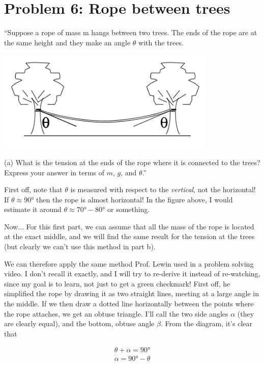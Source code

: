 \documentclass[12pt,a4paper]{report}
\begin{document}
\section{Problem 6: Rope between trees}

``Suppose a rope of mass m hangs between two trees. The ends of the rope are at the same height and they make an angle $\theta$ with the trees.

\begin{center}
\includegraphics[scale=0.5]{Graphics/h3p6}
\end{center}

(a) What is the tension at the ends of the rope where it is connected to the trees? Express your answer in terms of $m$, $g$, and $\theta$.''

First off, note that $\theta$ is measured with respect to the \emph{vertical}, not the horizontal! If $\theta \approx \ang{90}$ then the rope is almost horizontal! In the figure above, I would estimate it around $\theta \approx \ang{70}-\ang{80}$ or something.

Now... For this first part, we can assume that all the mass of the rope is located at the exact middle, and we will find the same result for the tension at the trees (but clearly we can't use this method in part b).

We can therefore apply the same method Prof. Lewin used in a problem solving video. I don't recall it exactly, and I will try to re-derive it instead of re-watching, since my goal is to learn, not just to get a green checkmark! First off, he simplified the rope by drawing it as two straight lines, meeting at a large angle in the middle. If we then draw a dotted line horizontally between the points where the rope attaches, we get an obtuse triangle. I'll call the two side angles $\alpha$ (they are clearly equal), and the bottom, obtuse angle $\beta$. From the diagram, it's clear that

\begin{align}
\theta + \alpha = \ang{90}\\
\alpha = \ang{90} - \theta
\end{align}
\end{document}
